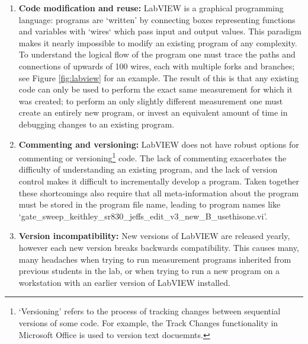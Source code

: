 \documentclass[edeposit,fullpage,draftthesis]{uiucthesis2009}
\begin{document}
\begin{appendices}
    \begin{enumerate}
        \item \textbf{Code modification and reuse:} LabVIEW is a graphical programming language: 
            programs are `written' by connecting boxes representing functions and variables with `wires` which
            pass input and output values. This paradigm makes it nearly impossible to modify
            an existing program of any complexity. To understand the logical flow of the program
            one must trace the paths and connections of upwards of 100 wires, each with multiple forks
            and branches; see Figure \ref{fig:labview} for an example. 
            The result of this is that any existing code can only be used to
            perform the exact same measurement for which it was created; to perform an only slightly 
            different measurement one must create an entirely new program, or invest an equivalent 
            amount of time in debugging changes to an existing program.
        \item \textbf{Commenting and versioning:} LabVIEW does not have robust options for commenting
            or versioning\footnote{`Versioning' refers to the process of tracking changes
            between sequential versions of some code. For example, the Track Changes functionality in Microsoft
            Office is used to version text docuemnts.} code. The lack of commenting exacerbates the difficulty of understanding
            an existing program, and the lack of version control makes it difficult to incrementally
            develop a program. Taken together these shortcomings also require that all meta-information about the
            program must be stored in the program file name, leading to program names like 
            `gate\_sweep\_keithley\_sr830\_jeffs\_edit\_v3\_new\_B\_usethisone.vi'.
        \item \textbf{Version incompatibility:} New versions of LabVIEW are released 
            yearly, however each new version breaks backwards compatibility.
            This causes many, many headaches when trying to run measurement programs inherited
            from previous students in the lab, or when trying to run a new program on a workstation
            with an earlier version of LabVIEW installed.
    \end{enumerate}
        

\end{appendices}
\end{document}
